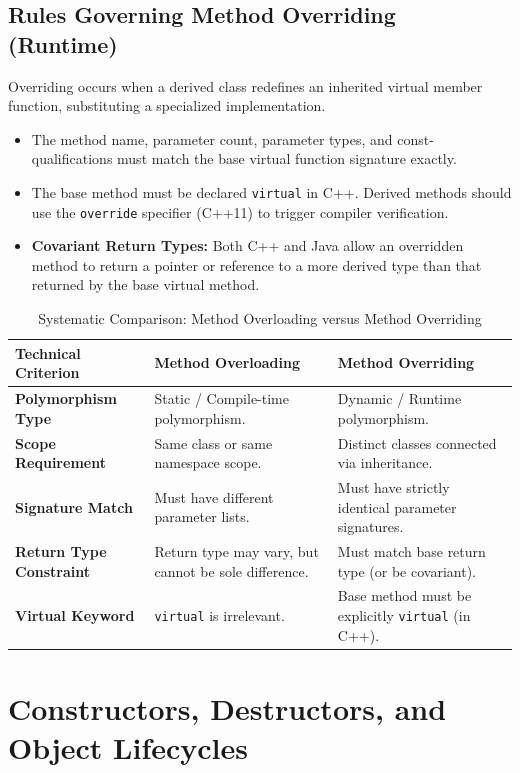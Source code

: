 \subsection{Rules Governing Method Overriding (Runtime)}
Overriding occurs when a derived class redefines an inherited virtual member function, substituting a specialized implementation.
\begin{itemize}[leftmargin=*]
    \item The method name, parameter count, parameter types, and const-qualifications must match the base virtual function signature exactly.
    \item The base method must be declared \texttt{virtual} in C++. Derived methods should use the \texttt{override} specifier (C++11) to trigger compiler verification.
    \item \textbf{Covariant Return Types:} Both C++ and Java allow an overridden method to return a pointer or reference to a more derived type than that returned by the base virtual method.
\end{itemize}

\begin{table}[htbp]
\centering
\small
\begin{tabularx}{\textwidth}{l X X}
\toprule
\textbf{Technical Criterion} & \textbf{Method Overloading} & \textbf{Method Overriding} \\
\midrule
\textbf{Polymorphism Type} & Static / Compile-time polymorphism. & Dynamic / Runtime polymorphism. \\
\textbf{Scope Requirement} & Same class or same namespace scope. & Distinct classes connected via inheritance. \\
\textbf{Signature Match} & Must have different parameter lists. & Must have strictly identical parameter signatures. \\
\textbf{Return Type Constraint} & Return type may vary, but cannot be sole difference. & Must match base return type (or be covariant). \\
\textbf{Virtual Keyword} & \texttt{virtual} is irrelevant. & Base method must be explicitly \texttt{virtual} (in C++). \\
\bottomrule
\end{tabularx}
\caption{Systematic Comparison: Method Overloading versus Method Overriding}
\label{tab:overloading_vs_overriding}
\end{table}

\section{Constructors, Destructors, and Object Lifecycles}
\label{sec:constructors_destructors}

